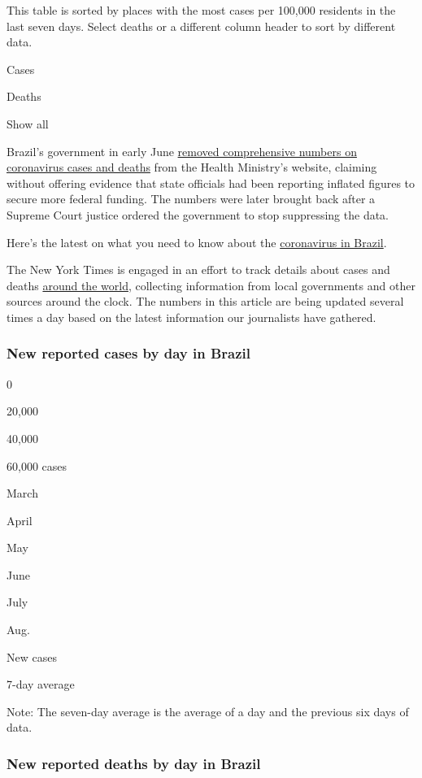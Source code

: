 This table is sorted by places with the most cases per 100,000 residents
in the last seven days. Select deaths or a different column header to
sort by different data.

Cases

Deaths

Show all

Brazil's government in early June
\href{https://www.nytimes.com/2020/06/06/world/coronavirus-update-us-usa.html\#link-3cfab740}{removed
comprehensive numbers on coronavirus cases and deaths} from the Health
Ministry's website, claiming without offering evidence that state
officials had been reporting inflated figures to secure more federal
funding. The numbers were later brought back after a Supreme Court
justice ordered the government to stop suppressing the data.

Here's the latest on what you need to know about the
\href{https://www.nytimes.com/article/brazil-coronavirus-cases.html}{coronavirus
in Brazil}.

The New York Times is engaged in an effort to track details about cases
and deaths
\href{https://www.nytimes.com/interactive/2020/world/coronavirus-maps.html}{around
the world}, collecting information from local governments and other
sources around the clock. The numbers in this article are being updated
several times a day based on the latest information our journalists have
gathered.

\hypertarget{new-reported-cases-by-day-in-brazil}{%
\subsubsection{New reported cases by day in
Brazil}\label{new-reported-cases-by-day-in-brazil}}

0

20,000

40,000

60,000 cases

March

April

May

June

July

Aug.

New cases

7-day average

Note: The seven-day average is the average of a day and the previous six
days of data.

\hypertarget{new-reported-deaths-by-day-in-brazil}{%
\subsubsection{New reported deaths by day in
Brazil}\label{new-reported-deaths-by-day-in-brazil}}

